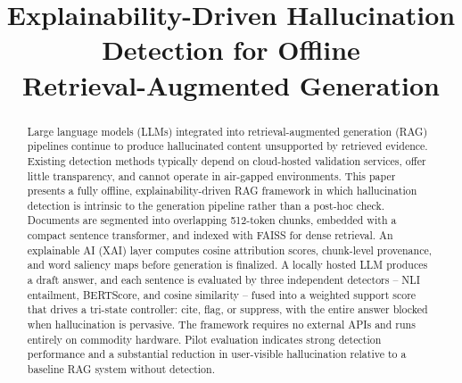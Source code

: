 \documentclass[conference]{IEEEtran}
\begin{document}
\title{Explainability-Driven Hallucination Detection for Offline\\ Retrieval-Augmented Generation}

\author{
\and
{}
\and
{}
}

\maketitle

\begin{abstract}
Large language models (LLMs) integrated into retrieval-augmented generation (RAG) pipelines continue to produce hallucinated content unsupported by retrieved evidence. Existing detection methods typically depend on cloud-hosted validation services, offer little transparency, and cannot operate in air-gapped environments. This paper presents a fully offline, explainability-driven RAG framework in which hallucination detection is intrinsic to the generation pipeline rather than a post-hoc check. Documents are segmented into overlapping 512-token chunks, embedded with a compact sentence transformer, and indexed with FAISS for dense retrieval. An explainable AI (XAI) layer computes cosine attribution scores, chunk-level provenance, and word saliency maps before generation is finalized. A locally hosted LLM produces a draft answer, and each sentence is evaluated by three independent detectors -- NLI entailment, BERTScore, and cosine similarity -- fused into a weighted support score that drives a tri-state controller: cite, flag, or suppress, with the entire answer blocked when hallucination is pervasive. The framework requires no external APIs and runs entirely on commodity hardware. Pilot evaluation indicates strong detection performance and a substantial reduction in user-visible hallucination relative to a baseline RAG system without detection.
\end{abstract}
\end{document}
